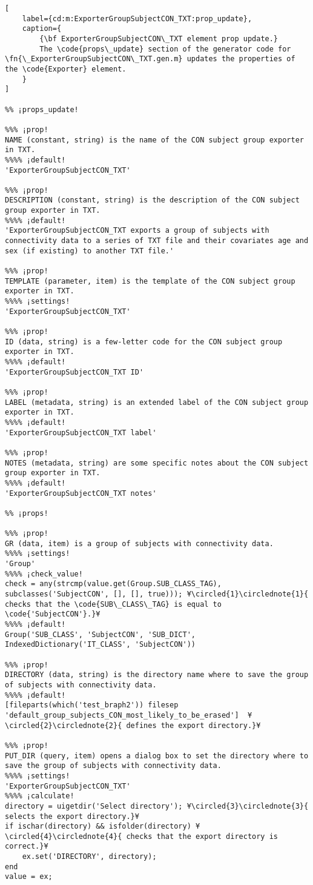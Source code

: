 \documentclass{tufte-handout}
\begin{document}
\begin{lstlisting}[
	label={cd:m:ExporterGroupSubjectCON_TXT:prop_update},
	caption={
		{\bf ExporterGroupSubjectCON\_TXT element prop update.}
		The \code{props\_update} section of the generator code for \fn{\_ExporterGroupSubjectCON\_TXT.gen.m} updates the properties of the \code{Exporter} element.
	}
]

%% ¡props_update!

%%% ¡prop!
NAME (constant, string) is the name of the CON subject group exporter in TXT.
%%%% ¡default!
'ExporterGroupSubjectCON_TXT'

%%% ¡prop!
DESCRIPTION (constant, string) is the description of the CON subject group exporter in TXT.
%%%% ¡default!
'ExporterGroupSubjectCON_TXT exports a group of subjects with connectivity data to a series of TXT file and their covariates age and sex (if existing) to another TXT file.'

%%% ¡prop!
TEMPLATE (parameter, item) is the template of the CON subject group exporter in TXT.
%%%% ¡settings!
'ExporterGroupSubjectCON_TXT'

%%% ¡prop!
ID (data, string) is a few-letter code for the CON subject group exporter in TXT.
%%%% ¡default!
'ExporterGroupSubjectCON_TXT ID'

%%% ¡prop!
LABEL (metadata, string) is an extended label of the CON subject group exporter in TXT.
%%%% ¡default!
'ExporterGroupSubjectCON_TXT label'

%%% ¡prop!
NOTES (metadata, string) are some specific notes about the CON subject group exporter in TXT.
%%%% ¡default!
'ExporterGroupSubjectCON_TXT notes'

%% ¡props!

%%% ¡prop!
GR (data, item) is a group of subjects with connectivity data. 
%%%% ¡settings!
'Group'
%%%% ¡check_value!
check = any(strcmp(value.get(Group.SUB_CLASS_TAG), subclasses('SubjectCON', [], [], true))); ¥\circled{1}\circlednote{1}{ checks that the \code{SUB\_CLASS\_TAG} is equal to \code{'SubjectCON'}.}¥
%%%% ¡default!
Group('SUB_CLASS', 'SubjectCON', 'SUB_DICT', IndexedDictionary('IT_CLASS', 'SubjectCON'))

%%% ¡prop!
DIRECTORY (data, string) is the directory name where to save the group of subjects with connectivity data.
%%%% ¡default!
[fileparts(which('test_braph2')) filesep 'default_group_subjects_CON_most_likely_to_be_erased']  ¥\circled{2}\circlednote{2}{ defines the export directory.}¥

%%% ¡prop!
PUT_DIR (query, item) opens a dialog box to set the directory where to save the group of subjects with connectivity data.
%%%% ¡settings!
'ExporterGroupSubjectCON_TXT'
%%%% ¡calculate!
directory = uigetdir('Select directory'); ¥\circled{3}\circlednote{3}{ selects the export directory.}¥
if ischar(directory) && isfolder(directory) ¥\circled{4}\circlednote{4}{ checks that the export directory is correct.}¥
	ex.set('DIRECTORY', directory);
end
value = ex;


\end{lstlisting}
\end{document}
